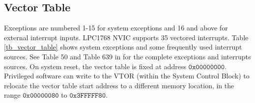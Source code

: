 \subsection{Vector Table}
Exceptions are numbered 1-15 for system exceptions and 
16 and above for external interrupt inputs. LPC1768 NVIC supports 
35 vectored interrupts. Table \ref{tb_vector_table} shows system exceptions  
and some frequently used interrupt sources. 
See Table 50 and Table 639 in \cite{nxp.lpc17xx.manual} for the complete
exceptions and interrupts sources. 
On system reset, the vector table is fixed at address $\mathtt{0x00000000}$. 
Privileged software can write to the VTOR (within the System Control Block) to relocate the vector table start address to a different memory location, in the range $\mathtt{0x00000080}$ to $\mathtt{0x3FFFFF80}$. 


